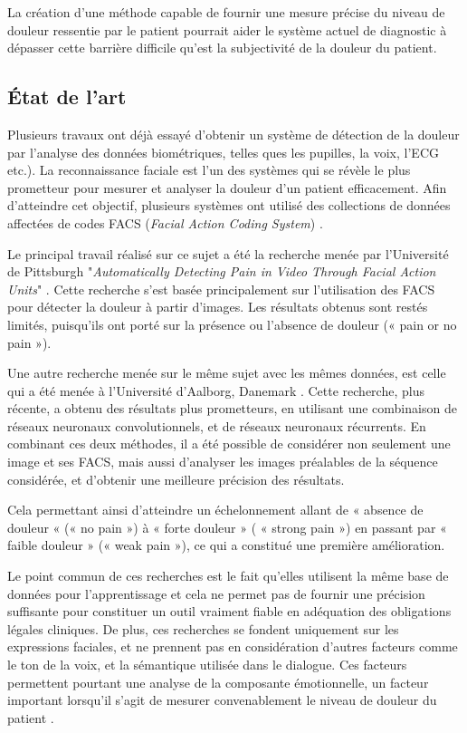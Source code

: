 \documentclass[french]{article}
\begin{document}
La création  d’une méthode capable  de fournir une  mesure précise du  niveau de
douleur ressentie par le patient pourrait  aider le système actuel de diagnostic
à dépasser  cette barrière  difficile qu'est  la subjectivité  de la  douleur du
patient.

\subsection{État de l’art}
\label{sec:org8119c98}
Plusieurs travaux  ont déjà essayé d’obtenir  un système de détection  de la
douleur par  l’analyse des  données biométriques, telles  ques les  pupilles, la
voix, l'ECG etc.). La reconnaissance faciale est l'un des systèmes qui se révèle
le  plus   prometteur  pour  mesurer   et  analyser  la  douleur   d'un  patient
efficacement.  Afin d’atteindre cet objectif, plusieurs systèmes ont utilisé des
collections  de données  affectées  de codes  FACS (\emph{Facial Action  Coding System}) \cite{lucey2011painful}.

Le  principal  travail  réalisé sur  ce  sujet  a  été  la recherche  menée  par
l’Université de Pittsburgh "\emph{Automatically  Detecting Pain in Video Through Facial  Action Units}"  \cite{lucey2011automatically}.
Cette  recherche s’est basée  principalement sur  l’utilisation des  FACS  pour
détecter  la douleur  à partir d'images. Les résultats obtenus sont restés
limités, puisqu'ils ont porté sur la présence ou l’absence de douleur (« pain or
no pain »). 

Une autre recherche  menée sur le même  sujet avec les mêmes  données, est celle
qui a été menée à l’Université d’Aalborg, Danemark \cite{bellantonio2016spatio}.
 Cette  recherche, plus récente,  a obtenu des  résultats  plus  prometteurs,
en  utilisant  une  combinaison  de  réseaux neuronaux convolutionnels, et de
réseaux neuronaux récurrents.  En combinant ces deux méthodes, il  a été
possible de  considérer non seulement une  image et ses FACS, mais aussi
d’analyser les images  préalables de la séquence considérée, et d’obtenir  une
meilleure  précision  des  résultats. 

Cela  permettant  ainsi d’atteindre un échelonnement allant de « absence de
douleur « (« no pain ») à « forte douleur » ( « strong pain ») en  passant par «
faible douleur » (« weak pain »), ce qui a constitué une première amélioration.


Le point commun de ces recherches est le fait qu’elles utilisent la même base de
données pour l’apprentissage et cela ne permet pas de fournir une précision
suffisante pour constituer un outil vraiment fiable en adéquation des
obligations légales cliniques. De plus, ces recherches se fondent uniquement sur
les expressions faciales, et ne prennent pas en considération d’autres facteurs
comme le ton de la voix, et la sémantique utilisée dans le dialogue. Ces
facteurs permettent pourtant une analyse de la composante émotionnelle, un facteur
important lorsqu’il s’agit de mesurer convenablement le niveau de douleur du
patient \cite{hale1997emotional}.   
\end{document}
